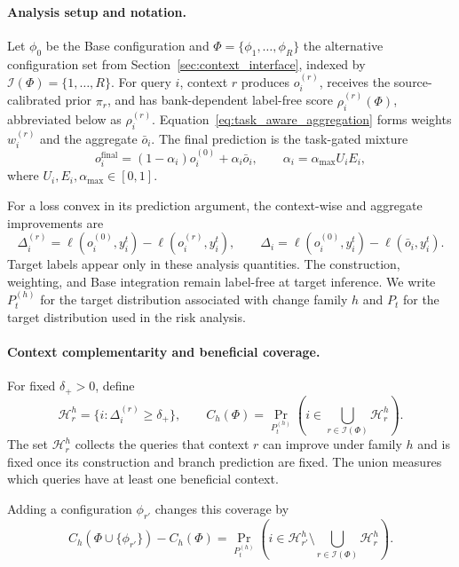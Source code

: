 \paragraph{Analysis setup and notation.}
\label{app:analysis-setup}

Let $\phi_0$ be the Base configuration and
$\Phi=\{\phi_1,\ldots,\phi_R\}$ the alternative configuration set from
Section~\ref{sec:context_interface}, indexed by
$\mathcal I(\Phi)=\{1,\ldots,R\}$. For query $i$, context $r$ produces $o_i^{(r)}$, receives
the source-calibrated prior $\pi_r$, and has bank-dependent label-free score
$\rho_i^{(r)}(\Phi)$, abbreviated below as $\rho_i^{(r)}$.
Equation~\eqref{eq:task_aware_aggregation} forms
weights $w_i^{(r)}$ and the aggregate $\bar o_i$.  The final prediction is
the task-gated mixture
\[
o_i^{\mathrm{final}}=(1-\alpha_i)o_i^{(0)}+\alpha_i\bar o_i,
\qquad
\alpha_i=\alpha_{\max}U_iE_i,
\]
where $U_i,E_i,\alpha_{\max}\in[0,1]$.

For a loss convex in its prediction argument, the context-wise and aggregate
improvements are
\[
\Delta_i^{(r)}
=\ell(o_i^{(0)},y_i^t)-\ell(o_i^{(r)},y_i^t),
\qquad
\Delta_i
=\ell(o_i^{(0)},y_i^t)-\ell(\bar o_i,y_i^t).
\]
Target labels appear only in these analysis quantities.  The construction,
weighting, and Base integration remain label-free at target inference.  We
write $P_t^{(h)}$ for the target distribution associated with change family
$h$ and $P_t$ for the target distribution used in the risk analysis.

\paragraph{Context complementarity and beneficial coverage.}
\label{app:repair-coverage}

For fixed $\delta_+>0$, define
\begin{equation}
\mathcal H_r^h
=\{i:\Delta_i^{(r)}\geq\delta_+\},
\qquad
C_h(\Phi)
  =\Pr_{P_t^{(h)}}\!\left(i\in\bigcup_{r\in\mathcal I(\Phi)}\mathcal H_r^h\right).
\label{eq:potential_repair_coverage}
\end{equation}
The set $\mathcal H_r^h$ collects the queries that context $r$ can improve
under family $h$ and is fixed once its construction and branch prediction are
fixed.  The union measures which queries have at least one beneficial context.

Adding a configuration $\phi_{r'}$ changes this coverage by
\begin{equation}
  C_h(\Phi\cup\{\phi_{r'}\})-C_h(\Phi)
  =\Pr_{P_t^{(h)}}\!\left(
    i\in\mathcal H_{r'}^h\setminus
    \bigcup_{r\in\mathcal I(\Phi)}\mathcal H_r^h
  \right).
  \label{eq:coverage_gain}
\end{equation}

